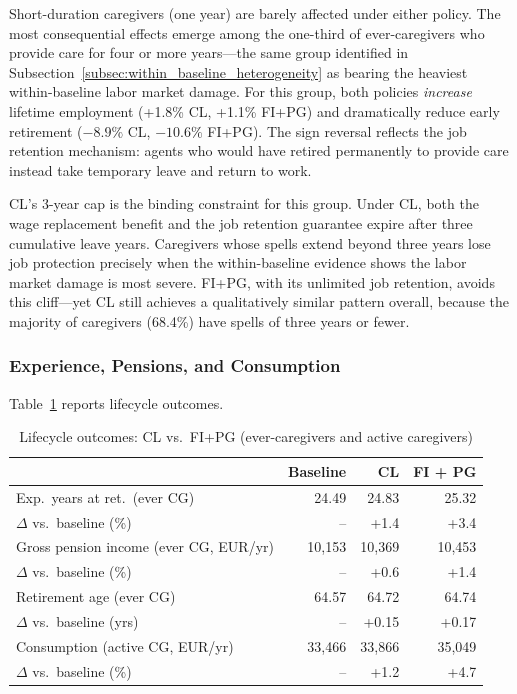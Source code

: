 Short-duration caregivers (one year) are barely affected under either policy. The most consequential effects emerge among the one-third of ever-caregivers who provide care for four or more years---the same group identified in Subsection~\ref{subsec:within_baseline_heterogeneity} as bearing the heaviest within-baseline labor market damage. For this group, both policies \textit{increase} lifetime employment (+1.8\% CL, +1.1\% FI+PG) and dramatically reduce early retirement ($-8.9\%$ CL, $-10.6\%$ FI+PG). The sign reversal reflects the job retention mechanism: agents who would have retired permanently to provide care instead take temporary leave and return to work.

CL's 3-year cap is the binding constraint for this group. Under CL, both the wage replacement benefit and the job retention guarantee expire after three cumulative leave years. Caregivers whose spells extend beyond three years lose job protection precisely when the within-baseline evidence shows the labor market damage is most severe. FI+PG, with its unlimited job retention, avoids this cliff---yet CL still achieves a qualitatively similar pattern overall, because the majority of caregivers (68.4\%) have spells of three years or fewer.

\subsubsection{Experience, Pensions, and Consumption}

Table~\ref{tab:main_outcomes} reports lifecycle outcomes.

\begin{table}[htbp]
  \centering
  \caption{Lifecycle outcomes: CL vs.\ FI+PG (ever-caregivers and active caregivers)}
  \label{tab:main_outcomes}
  \small
  \begin{tabular}{lrrr}
    \toprule
    & Baseline & CL & FI + PG \\
    \midrule
    Exp.\ years at ret.\ (ever CG) & 24.49 & 24.83 & 25.32 \\
    $\Delta$ vs.\ baseline (\%) & -- & +1.4 & +3.4 \\
    Gross pension income (ever CG, EUR/yr) & 10,153 & 10,369 & 10,453 \\
    $\Delta$ vs.\ baseline (\%) & -- & +0.6 & +1.4 \\
    Retirement age (ever CG) & 64.57 & 64.72 & 64.74 \\
    $\Delta$ vs.\ baseline (yrs) & -- & +0.15 & +0.17 \\
    Consumption (active CG, EUR/yr) & 33,466 & 33,866 & 35,049 \\
    $\Delta$ vs.\ baseline (\%) & -- & +1.2 & +4.7 \\
    \bottomrule
  \end{tabular}
\end{table}

